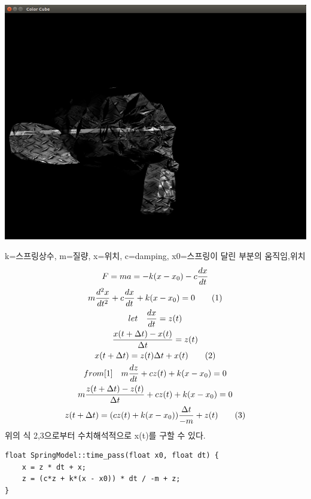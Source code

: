 \documentclass[12pt,a4paper]{article}
\begin{document}
\includegraphics[width=\textwidth]{2.png}



k=스프링상수, m=질량, x=위치, c=damping, x0=스프링이 달린 부분의 움직임,위치
\begin{gather*}
F = ma = -k(x-x_0) - c \frac{dx}{dt}\\
m\frac{d^2x}{dt^2} + c\frac{dx}{dt} + k(x - x_0) = 0\label{1}\tag{1}\\
let \quad \frac{dx}{dt} = z(t) \\
\frac{x(t + \Delta t)-x(t)}{\Delta t} = z(t)\\
x(t+\Delta t) = z(t)\Delta t + x(t) \tag{2}\\
from \eqref{1}\quad m\frac{dz}{dt} + cz(t) + k(x-x_0) = 0\\
m\frac{z(t+\Delta t)-z(t)}{\Delta t} + cz(t) + k(x-x_0)=0\\
z(t+\Delta t) = (cz(t) + k(x-x_0))\frac{\Delta t}{-m} +z(t)\tag{3}
\end{gather*}
위의 식 2,3으로부터 수치해석적으로 x(t)를 구할 수 있다.
\begin{lstlisting}
float SpringModel::time_pass(float x0, float dt) {
	x = z * dt + x;
	z = (c*z + k*(x - x0)) * dt / -m + z;
}
\end{lstlisting}
\end{document}
